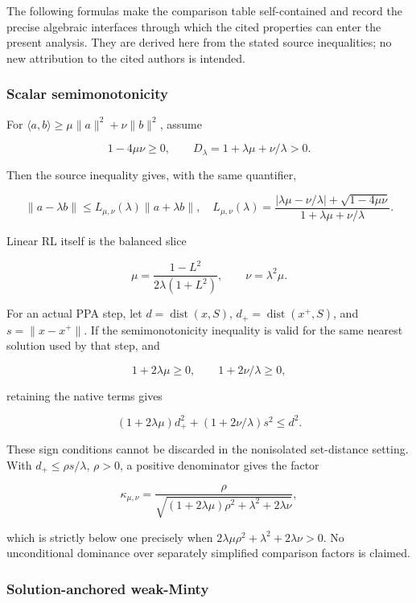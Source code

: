 \documentclass[11pt,a4paper]{article}
\theoremstyle{plain}
\theoremstyle{definition}
\theoremstyle{remark}
\begin{document}
The following formulas make the comparison table self-contained and
record the precise algebraic interfaces through which the cited
properties can enter the present analysis. They are derived here from
the stated source inequalities; no new attribution to the cited authors
is intended.

\hypertarget{scalar-semimonotonicity}{%
\subsubsection{Scalar
semimonotonicity}\label{scalar-semimonotonicity}}

For \(\langle a,b\rangle\ge\mu\|a\|^2+\nu\|b\|^2\), assume

\[
1-4\mu\nu\ge0,\qquad D_\lambda=1+\lambda\mu+\nu/\lambda>0.
\]

Then the source inequality gives, with the same quantifier,

\[
\|a-\lambda b\|\le L_{\mu,\nu}(\lambda)\|a+\lambda b\|,
\quad
L_{\mu,\nu}(\lambda)=
\frac{|\lambda\mu-\nu/\lambda|+\sqrt{1-4\mu\nu}}
{1+\lambda\mu+\nu/\lambda}.
\]

Linear RL itself is the balanced slice

\[
\mu=\frac{1-L^2}{2\lambda(1+L^2)},\qquad \nu=\lambda^2\mu.
\]

For an actual PPA step, let \(d=\operatorname{dist}(x,S)\),
\(d_+=\operatorname{dist}(x^+,S)\), and \(s=\|x-x^+\|\). If the
semimonotonicity inequality is valid for the same nearest solution used
by that step, and

\[
1+2\lambda\mu\ge0,\qquad1+2\nu/\lambda\ge0,
\]

retaining the native terms gives

\[
(1+2\lambda\mu)d_+^2+(1+2\nu/\lambda)s^2\le d^2.
\]

These sign conditions cannot be discarded in the nonisolated
set-distance setting. With \(d_+\le\rho s/\lambda\), \(\rho>0\), a
positive denominator gives the factor

\[
\kappa_{\mu,\nu}=
\frac{\rho}{\sqrt{(1+2\lambda\mu)\rho^2+\lambda^2+2\lambda\nu}},
\]

which is strictly below one precisely when
\(2\lambda\mu\rho^2+\lambda^2+2\lambda\nu>0\). No unconditional
dominance over separately simplified comparison factors is claimed.

\hypertarget{solution-anchored-weak-minty}{%
\subsubsection{Solution-anchored
weak-Minty}\label{solution-anchored-weak-minty}}
\end{document}
